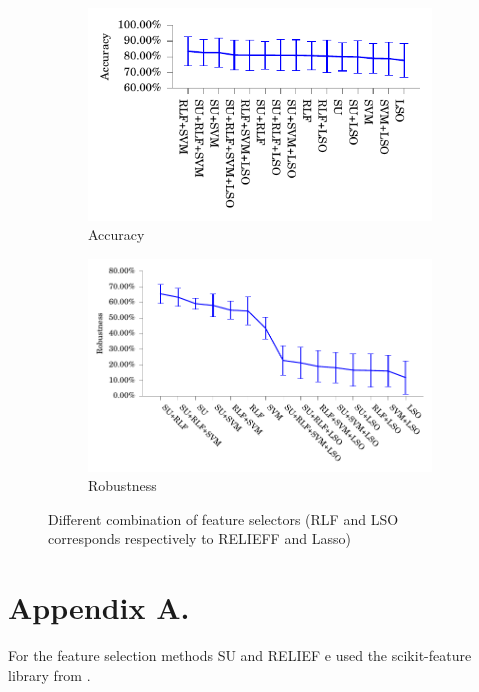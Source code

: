 \documentclass[twoside,11pt]{article}
\begin{document}
\begin{figure}
\centering
\begin{subfigure}{.5\textwidth}
  \centering
  \includegraphics[width=1.07\textwidth]{images/Accuracy_of_the_different_combinations.pdf}
  \caption{Accuracy}
  \label{fig:combination_accuracy}
\end{subfigure}%
\begin{subfigure}{.5\textwidth}
  \centering
  \includegraphics[width=1.07\textwidth]{images/Robustness_of_the_different_combinations.pdf}
  \caption{Robustness}
  \label{fig:combination_robustness}
\end{subfigure}
\caption{Different combination of feature selectors (RLF and LSO corresponds respectively to RELIEFF and Lasso)}
\label{fig:combination_results}
\end{figure}

\newpage

\appendix
\section*{Appendix A.}
For the feature selection methods SU and RELIEF e used the scikit-feature library from \cite{Li-etal16}.
\label{app:some appendix}


\vskip 0.2in

\end{document}
